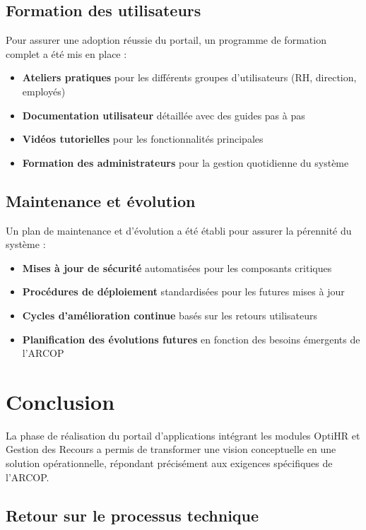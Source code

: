 \subsection{Formation des utilisateurs}
Pour assurer une adoption réussie du portail, un programme de formation complet a été mis en place :

\begin{itemize}
    \item \textbf{Ateliers pratiques} pour les différents groupes d'utilisateurs (RH, direction, employés)
    \item \textbf{Documentation utilisateur} détaillée avec des guides pas à pas
    \item \textbf{Vidéos tutorielles} pour les fonctionnalités principales
    \item \textbf{Formation des administrateurs} pour la gestion quotidienne du système
\end{itemize}

\subsection{Maintenance et évolution}
Un plan de maintenance et d'évolution a été établi pour assurer la pérennité du système :

\begin{itemize}
    \item \textbf{Mises à jour de sécurité} automatisées pour les composants critiques
    \item \textbf{Procédures de déploiement} standardisées pour les futures mises à jour
    \item \textbf{Cycles d'amélioration continue} basés sur les retours utilisateurs
    \item \textbf{Planification des évolutions futures} en fonction des besoins émergents de l'ARCOP
\end{itemize}

\section{Conclusion}

La phase de réalisation du portail d'applications intégrant les modules OptiHR et Gestion des Recours a permis de transformer une vision conceptuelle en une solution opérationnelle, répondant précisément aux exigences spécifiques de l'ARCOP.

\subsection{Retour sur le processus technique}

